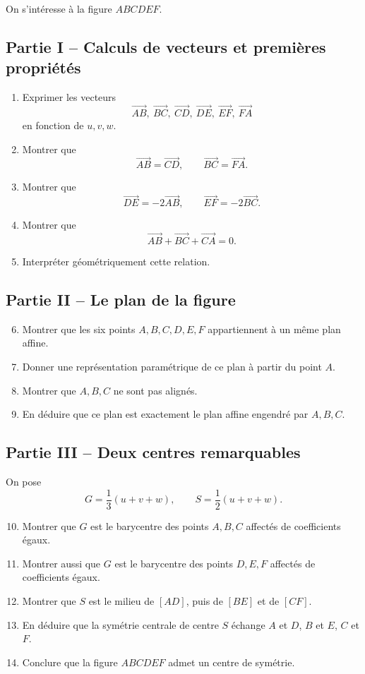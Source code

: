 \documentclass[11pt,a4paper]{article}
\begin{document}
On s'intéresse à la figure $ABCDEF$.

\subsection*{Partie I -- Calculs de vecteurs et premières propriétés}
\begin{enumerate}[label=\arabic*.]
    \item Exprimer les vecteurs
    \[
    \overrightarrow{AB},\ \overrightarrow{BC},\ \overrightarrow{CD},\ \overrightarrow{DE},\ \overrightarrow{EF},\ \overrightarrow{FA}
    \]
    en fonction de $u,v,w$.
    \item Montrer que
    \[
    \overrightarrow{AB}=\overrightarrow{CD},\qquad \overrightarrow{BC}=\overrightarrow{FA}.
    \]
    \item Montrer que
    \[
    \overrightarrow{DE}=-2\overrightarrow{AB},\qquad \overrightarrow{EF}=-2\overrightarrow{BC}.
    \]
    \item Montrer que
    \[
    \overrightarrow{AB}+\overrightarrow{BC}+\overrightarrow{CA}=0.
    \]
    \item Interpréter géométriquement cette relation.
\end{enumerate}

\subsection*{Partie II -- Le plan de la figure}
\begin{enumerate}[label=\arabic*.]
    \setcounter{enumi}{5}
    \item Montrer que les six points $A,B,C,D,E,F$ appartiennent à un même plan affine.
    \item Donner une représentation paramétrique de ce plan à partir du point $A$.
    \item Montrer que $A,B,C$ ne sont pas alignés.
    \item En déduire que ce plan est exactement le plan affine engendré par $A,B,C$.
\end{enumerate}

\subsection*{Partie III -- Deux centres remarquables}
On pose
\[
G=\frac13(u+v+w),\qquad S=\frac12(u+v+w).
\]
\begin{enumerate}[label=\arabic*.]
    \setcounter{enumi}{9}
    \item Montrer que $G$ est le barycentre des points $A,B,C$ affectés de coefficients égaux.
    \item Montrer aussi que $G$ est le barycentre des points $D,E,F$ affectés de coefficients égaux.
    \item Montrer que $S$ est le milieu de $[AD]$, puis de $[BE]$ et de $[CF]$.
    \item En déduire que la symétrie centrale de centre $S$ échange $A$ et $D$, $B$ et $E$, $C$ et $F$.
    \item Conclure que la figure $ABCDEF$ admet un centre de symétrie.
\end{enumerate}
\end{document}
